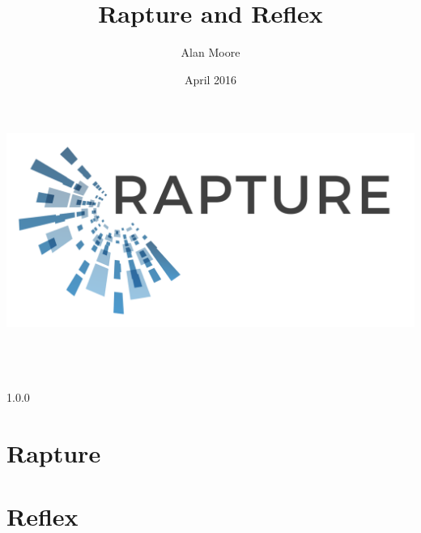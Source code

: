 \documentclass[12pt,twoside,a4paper]{book}
\begin{document}
\title{Rapture and Reflex}
\author{Alan Moore}
\date{April 2016}

\makeatletter
    \begin{titlepage}
      \includegraphics[width=0.7\linewidth]{Graphics/RaptureLogo.png}\\[4ex]
        \begin{center}
            {\huge \bfseries  \@title }\\[2ex]
            {\LARGE  \@author}\\[48ex]
            {\large \@date}\\[1ex]
						{\large 1.0.0}
        \end{center}
    \end{titlepage}
\makeatother
\thispagestyle{empty}
\newpage


\setcounter{tocdepth}{1}
\tableofcontents
\setcounter{page}{1} %


\part{Rapture}




\part{Reflex}















\end{document}
